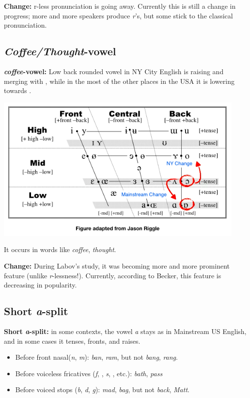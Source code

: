 \documentclass[11pt]{article}
\newcommand{\1}{$'$}
\newcommand{\2}{$''$}
\newcommand{\3}{$'''$}
\begin{document}
\noindent \textbf{Change:} r-less pronunciation is going away. Currently this is still a change in progress; more and more speakers produce \emph{r}'s, but some stick to the classical pronunciation.

\subsection{\emph{Coffee/Thought}-vowel}

\textbf{\emph{coffee}-vowel:} Low back rounded vowel \textipa{[0]} in NY City English is raising and merging with \textipa{[o]}, while in the most of the other places in the USA it is lowering towards \textipa{[6]}.

\begin{center}
	\includegraphics[width=.7\textwidth]{coffee.png}	
\end{center}

	\noindent It occurs in words like \emph{coffee}, \emph{thought}.
	
\noindent \textbf{Change:} During Labov's study, it was becoming more and more prominent feature (unlike \emph{r}-lessness!). Currently, according to Becker, this feature is decreasing in popularity.

\subsection{Short \emph{a}-split}

\textbf{Short \emph{a}-split:} in some contexts, the vowel \emph{a} stays as in Mainstream US English, and in some cases it tenses, fronts, and raises. 

	\begin{itemize}
		\item Before front nasal(\emph{n}, \emph{m}): \emph{ban}, \emph{ram}, but not \emph{bang}, \emph{rang}.
		\item Before voiceless fricatives (\emph{f}, \emph{}, \emph{s}, \emph{}, etc.): \emph{bath}, \emph{pass}
		\item Before voiced stops (\emph{b}, \emph{d}, \emph{g}): \emph{mad}, \emph{bag}, but not \emph{back}, \emph{Matt}.
	\end{itemize}
	
\end{document}
